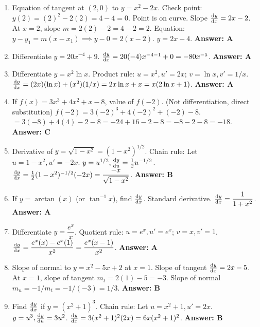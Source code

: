 \begin{enumerate}[label={\arabic*.}]
  \item Equation of tangent at \((2,0)\) to \(y = x^2 - 2x\).
    Check point: \(y(2) = (2)^2 - 2(2) = 4 - 4 = 0\). Point is on curve.
    Slope \(\frac{\mathrm{d}y}{\mathrm{d}x} = 2x - 2\).
    At \(x=2\), slope \(m = 2(2) - 2 = 4 - 2 = 2\).
    Equation: \(y - y_1 = m(x - x_1) \implies y - 0 = 2(x - 2)\).
    \(y = 2x - 4\).
    \textbf{Answer: A}

  \item Differentiate \(y = 20x^{-4} + 9\).
    \(\frac{\mathrm{d}y}{\mathrm{d}x} = 20(-4)x^{-4-1} + 0 = -80x^{-5}\).
    \textbf{Answer: A}

  \item Differentiate \(y = x^2 \ln x\).
    Product rule: \(u=x^2, u'=2x\); \(v=\ln x, v'=1/x\).
    \(\frac{\mathrm{d}y}{\mathrm{d}x} = (2x)(\ln x) + (x^2)(1/x) = 2x\ln x + x = x(2\ln x + 1)\).
    \textbf{Answer: A}

  \item If \(f(x) = 3x^3 + 4x^2 + x - 8\), value of \(f(-2)\). (Not differentiation, direct substitution)
    \(f(-2) = 3(-2)^3 + 4(-2)^2 + (-2) - 8\).
    \(= 3(-8) + 4(4) - 2 - 8 = -24 + 16 - 2 - 8 = -8 - 2 - 8 = -18\).
    \textbf{Answer: C}

  \item Derivative of \(y = \sqrt{1-x^2} = (1-x^2)^{1/2}\).
    Chain rule: Let \(u=1-x^2, u'=-2x\). \(y=u^{1/2}, \frac{\mathrm{d}y}{\mathrm{d}u}=\frac{1}{2}u^{-1/2}\).
    \(\frac{\mathrm{d}y}{\mathrm{d}x} = \frac{1}{2}(1-x^2)^{-1/2}(-2x) = \dfrac{-x}{\sqrt{1-x^2}}\).
    \textbf{Answer: B}

  \item If \(y = \arctan(x)\) (or \(\tan^{-1}x\)), find \(\frac{\mathrm{d}y}{\mathrm{d}x}\). Standard derivative.
    \(\frac{\mathrm{d}y}{\mathrm{d}x} = \dfrac{1}{1+x^2}\).
    \textbf{Answer: A}

  \item Differentiate \(y = \dfrac{e^x}{x}\).
    Quotient rule: \(u=e^x, u'=e^x\); \(v=x, v'=1\).
    \(\frac{\mathrm{d}y}{\mathrm{d}x} = \dfrac{e^x(x) - e^x(1)}{x^2} = \dfrac{e^x(x-1)}{x^2}\).
    \textbf{Answer: A}

  \item Slope of normal to \(y = x^2 - 5x + 2\) at \(x=1\).
    Slope of tangent \(\frac{\mathrm{d}y}{\mathrm{d}x} = 2x - 5\).
    At \(x=1\), slope of tangent \(m_t = 2(1) - 5 = -3\).
    Slope of normal \(m_n = -1/m_t = -1/(-3) = 1/3\).
    \textbf{Answer: B}

  \item Find \(\frac{\mathrm{d}y}{\mathrm{d}x}\) if \(y = (x^2+1)^3\).
    Chain rule: Let \(u=x^2+1, u'=2x\). \(y=u^3, \frac{\mathrm{d}y}{\mathrm{d}u}=3u^2\).
    \(\frac{\mathrm{d}y}{\mathrm{d}x} = 3(x^2+1)^2(2x) = 6x(x^2+1)^2\).
    \textbf{Answer: B}


\end{enumerate}
